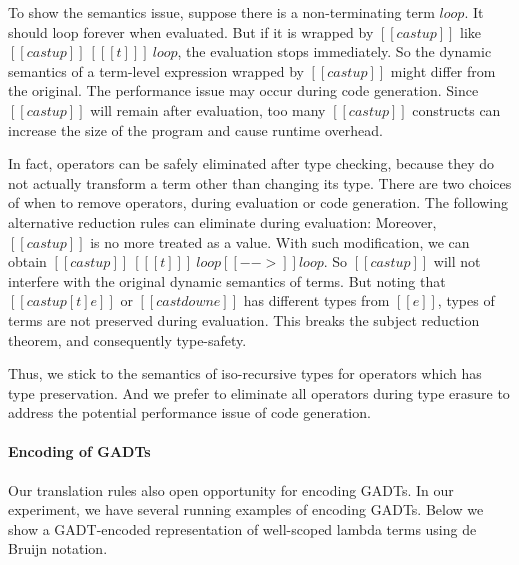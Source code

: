 To show the semantics issue, suppose there is a non-terminating term
$\mathit{loop}$. It should loop forever when evaluated. But if it is
wrapped by $[[castup]]$ like $[[castup]]~[ [[t]] ]~\mathit{loop}$, the
evaluation stops immediately. So the dynamic semantics of a term-level
expression wrapped by $[[castup]]$ might differ from the original. The
performance issue may occur during code generation. Since $[[castup]]$
will remain after evaluation, too many $[[castup]]$ constructs can
increase the size of the program and cause runtime overhead.

In fact, \cast operators can be safely eliminated after type checking,
because they do not actually transform a term other than changing its
type. There are two choices of when to remove \cast operators, during
evaluation or code generation. The following alternative reduction
rules can eliminate \cast during evaluation:
\ottusedrule{\ottdruleSXXCastUpE{}}
\ottusedrule{\ottdruleSXXCastDownE{}} Moreover, $[[castup]]$ is no
more treated as a value. With such modification, we can obtain
$[[castup]]~[ [[t]] ]~\mathit{loop} [[-->]] \mathit{loop}$. So
$[[castup]]$ will not interfere with the original dynamic semantics of
terms. But noting that $[[castup [t] e]]$ or $[[castdown e]]$ has
different types from $[[e]]$, types of terms are not preserved during
evaluation. This breaks the subject reduction theorem, and
consequently type-safety.

Thus, we stick to the semantics of iso-recursive types for \cast
operators which has type preservation. And we prefer to eliminate
all \cast operators during type erasure to address the potential
performance issue of code generation.

\paragraph{Encoding of GADTs}

Our translation rules also open opportunity for encoding GADTs. In our
experiment, we have several running examples of encoding GADTs. Below
we show a GADT-encoded representation of well-scoped lambda terms
using de Bruijn notation.

